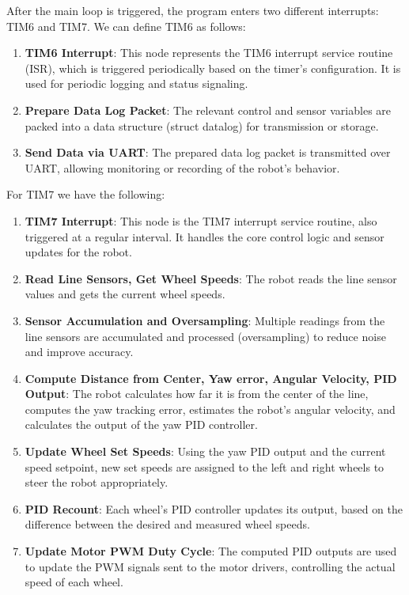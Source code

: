 \documentclass[english]{article}
\begin{document}
After the main loop is triggered, the program enters two different interrupts: TIM6 and TIM7. We can define TIM6 as follows:
\begin{enumerate}
    \item \textbf{TIM6 Interrupt}: This node represents the TIM6 interrupt service routine (ISR), which is triggered periodically based on the timer’s configuration. It is used for periodic logging and status signaling.\
    \item \textbf{Prepare Data Log Packet}: The relevant control and sensor variables are packed into a data structure (struct datalog) for transmission or storage.\
    \item \textbf{Send Data via UART}: The prepared data log packet is transmitted over UART, allowing monitoring or recording of the robot’s behavior.
\end{enumerate}

For TIM7 we have the following:
\begin{enumerate}
    \item \textbf{TIM7 Interrupt}: This node is the TIM7 interrupt service routine, also triggered at a regular interval. It handles the core control logic and sensor updates for the robot.\
    \item \textbf{Read Line Sensors, Get Wheel Speeds}: The robot reads the line sensor values and gets the current wheel speeds.\
    \item \textbf{Sensor Accumulation and Oversampling}: Multiple readings from the line sensors are accumulated and processed (oversampling) to reduce noise and improve accuracy.\
    \item \textbf{Compute Distance from Center, Yaw error, Angular Velocity, PID Output}: The robot calculates how far it is from the center of the line, computes the yaw tracking error, estimates the robot’s angular velocity, and calculates the output of the yaw PID controller.\
    \item \textbf{Update Wheel Set Speeds}: Using the yaw PID output and the current speed setpoint, new set speeds are assigned to the left and right wheels to steer the robot appropriately.\
    \item \textbf{PID Recount}: Each wheel’s PID controller updates its output, based on the difference between the desired and measured wheel speeds.\
    \item \textbf{Update Motor PWM Duty Cycle}: The computed PID outputs are used to update the PWM signals sent to the motor drivers, controlling the actual speed of each wheel.
\end{enumerate}
\end{document}
